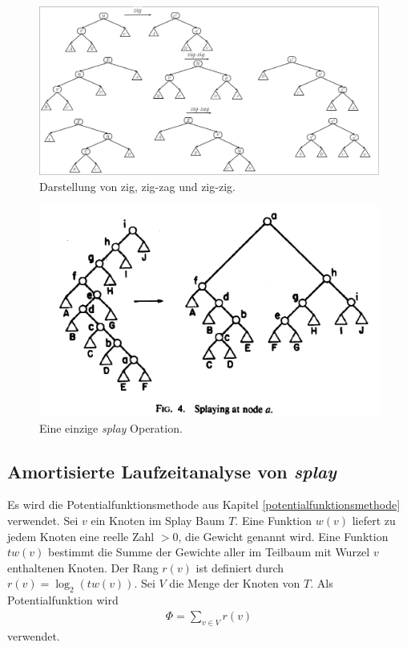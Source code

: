 \documentclass[a4paper,12pt]{article}
\begin{document}
\begin{figure}[h]
	\centering
	\includegraphics[width= 1.2\textwidth]{"Medien/Splaybaum/zigZag"}
	\caption{Darstellung von zig, zig-zag und zig-zig. }
	\label{fig:zigZag}
\end{figure}
\begin{figure}[h]
	\centering
	\includegraphics[width= 1\textwidth]{"Medien/Splaybaum/splay"}
	\caption{Eine einzige \textit{splay } Operation.\cite{splay}}
	\label{fig:splay}
\end{figure}

\subsection{Amortisierte Laufzeitanalyse von \textit{splay }}
Es wird die Potentialfunktionsmethode aus Kapitel \ref{potentialfunktionsmethode} verwendet. Sei $v$ ein Knoten im Splay Baum $T$. Eine Funktion $w\left(v\right)$ liefert zu jedem Knoten eine reelle Zahl $>0$, die Gewicht genannt wird. Eine Funktion $\mathit{tw}\left(v\right)$ bestimmt die Summe der Gewichte aller im Teilbaum mit Wurzel $v$ enthaltenen Knoten. Der Rang  $r\left(v\right)$ ist definiert durch $r\left(v\right) = \log_2 \left( \mathit{tw}\left(v\right)\right)$. Sei $V$ die Menge der Knoten von $T$. Als Potentialfunktion wird 
\begin{align*}
\Phi = \sum_{v \in V} r\left(v\right)
\end{align*}
verwendet.
\end{document}
